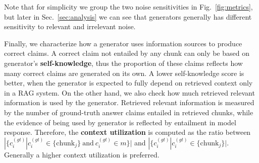 Note that for simplicity we group the two noise sensitivities in Fig.~\ref{fig:metrics}, but later in Sec.~\ref{sec:analysis} we can see that generators generally has different sensitivity to relevant and irrelevant noise.


Finally, we characterize how a generator uses information sources to produce correct claims. A correct claim not entailed by any chunk can only be based on generator’s \textbf{self-knowledge}, thus the proportion of these claims reflects how many correct claims are generated on its own. A lower self-knowledge score is better, when the generator is expected to fully depend on retrieved context only in a RAG system. On the other hand, we also check how much retrieved relevant information is used by the generator. Retrieved relevant information is measured by the number of ground-truth answer claims entailed in retrieved chunks, while the evidence of being used by generator is reflected by entailment in model response. Therefore, the \textbf{context utilization} is computed as the ratio between $|\{c^{(gt)}_i | c^{(gt)}_i \in \{\text{chunk}_j\}~\text{and}~c^{(gt)}_i \in m\}|$ and $|\{c^{(gt)}_i | c^{(gt)}_i \in \{\text{chunk}_j\}|$. Generally a higher context utilization is preferred.
